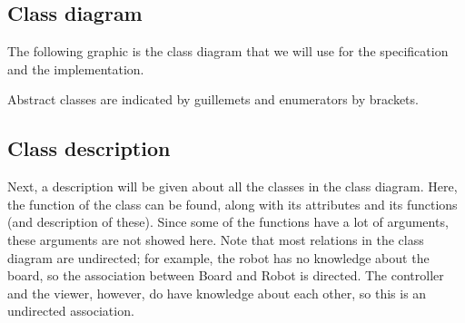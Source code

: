 \subsection{Class diagram}
	The following graphic is the class diagram that we will use for the specification and the implementation.

	
    Abstract classes are indicated by guillemets and enumerators by brackets.

\subsection{Class description}
    Next, a description will be given about all the classes in the class diagram. Here, the function of the class can be found, along with its attributes and its functions (and description of these). Since some of the functions have a lot of arguments, these arguments are not showed here. Note that most relations in the class diagram are undirected; for example, the robot has no knowledge about the board, so the association between Board and Robot is directed. The controller and the viewer, however, do have knowledge about each other, so this is an undirected association.

